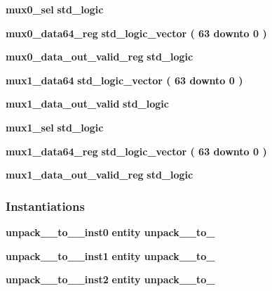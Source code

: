 \begin{DoxyCompactItemize}
\item 
{\bf mux0\+\_\+sel} {\bfseries \textcolor{comment}{std\+\_\+logic}\textcolor{vhdlchar}{ }} 
\item 
{\bf mux0\+\_\+data64\+\_\+reg} {\bfseries \textcolor{comment}{std\+\_\+logic\+\_\+vector}\textcolor{vhdlchar}{ }\textcolor{vhdlchar}{(}\textcolor{vhdlchar}{ }\textcolor{vhdlchar}{ } \textcolor{vhdldigit}{63} \textcolor{vhdlchar}{ }\textcolor{keywordflow}{downto}\textcolor{vhdlchar}{ }\textcolor{vhdlchar}{ } \textcolor{vhdldigit}{0} \textcolor{vhdlchar}{ }\textcolor{vhdlchar}{)}\textcolor{vhdlchar}{ }} 
\item 
{\bf mux0\+\_\+data\+\_\+out\+\_\+valid\+\_\+reg} {\bfseries \textcolor{comment}{std\+\_\+logic}\textcolor{vhdlchar}{ }} 
\item 
{\bf mux1\+\_\+data64} {\bfseries \textcolor{comment}{std\+\_\+logic\+\_\+vector}\textcolor{vhdlchar}{ }\textcolor{vhdlchar}{(}\textcolor{vhdlchar}{ }\textcolor{vhdlchar}{ } \textcolor{vhdldigit}{63} \textcolor{vhdlchar}{ }\textcolor{keywordflow}{downto}\textcolor{vhdlchar}{ }\textcolor{vhdlchar}{ } \textcolor{vhdldigit}{0} \textcolor{vhdlchar}{ }\textcolor{vhdlchar}{)}\textcolor{vhdlchar}{ }} 
\item 
{\bf mux1\+\_\+data\+\_\+out\+\_\+valid} {\bfseries \textcolor{comment}{std\+\_\+logic}\textcolor{vhdlchar}{ }} 
\item 
{\bf mux1\+\_\+sel} {\bfseries \textcolor{comment}{std\+\_\+logic}\textcolor{vhdlchar}{ }} 
\item 
{\bf mux1\+\_\+data64\+\_\+reg} {\bfseries \textcolor{comment}{std\+\_\+logic\+\_\+vector}\textcolor{vhdlchar}{ }\textcolor{vhdlchar}{(}\textcolor{vhdlchar}{ }\textcolor{vhdlchar}{ } \textcolor{vhdldigit}{63} \textcolor{vhdlchar}{ }\textcolor{keywordflow}{downto}\textcolor{vhdlchar}{ }\textcolor{vhdlchar}{ } \textcolor{vhdldigit}{0} \textcolor{vhdlchar}{ }\textcolor{vhdlchar}{)}\textcolor{vhdlchar}{ }} 
\item 
{\bf mux1\+\_\+data\+\_\+out\+\_\+valid\+\_\+reg} {\bfseries \textcolor{comment}{std\+\_\+logic}\textcolor{vhdlchar}{ }} 
\end{DoxyCompactItemize}
\subsubsection*{Instantiations}
 \begin{DoxyCompactItemize}
\item 
{\bf unpack\+\_\+\_\+to\+\_\+\_\+inst0}  {\bfseries entity unpack\+\_\+\_\+to\+\_}   
\item 
{\bf unpack\+\_\+\_\+to\+\_\+\_\+inst1}  {\bfseries entity unpack\+\_\+\_\+to\+\_}   
\item 
{\bf unpack\+\_\+\_\+to\+\_\+\_\+inst2}  {\bfseries entity unpack\+\_\+\_\+to\+\_}   
\end{DoxyCompactItemize}


